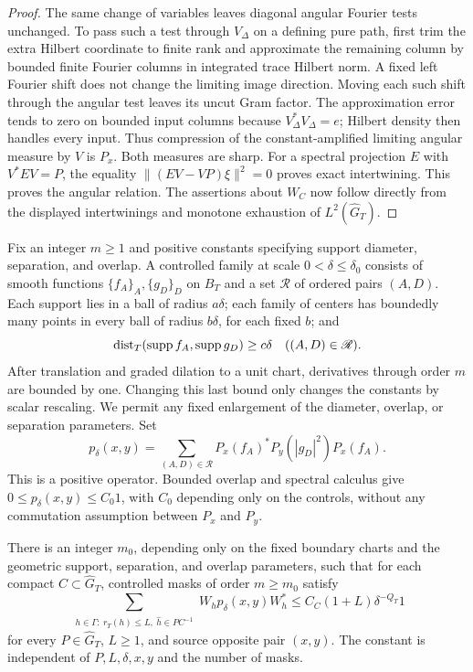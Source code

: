 \begin{proof}
The same change of variables leaves diagonal angular Fourier tests
unchanged.  To pass such a test through $V_\Delta$ on a defining pure
path, first trim the extra Hilbert coordinate to finite rank and
approximate the remaining column by bounded finite Fourier columns
in integrated trace Hilbert norm.  A fixed left Fourier shift does
not change the limiting image direction.  Moving each such shift
through the angular test leaves its uncut Gram factor.  The
approximation error tends to zero on bounded input columns because
$V_\Delta^*V_\Delta=e$; Hilbert density then handles every input.
Thus compression of the constant-amplified limiting angular measure
by $V$ is $P_x$.  Both measures are sharp.  For a spectral projection
$E$ with $V^*EV=P$, the equality
$\|(EV-VP)\xi\|^2=0$ proves exact intertwining.  This proves the
angular relation.  The assertions about $W_C$ now follow directly
from the displayed intertwinings and monotone exhaustion of
$L^2(\widehat G_T)$.
\end{proof}

\begin{definition}
\label{def:scale-mask-controls}
Fix an integer $m\ge1$ and positive constants specifying support
diameter, separation, and overlap.  A controlled family at scale
$0<\delta\le\delta_0$ consists of smooth functions
$\{f_A\}_A,\{g_D\}_D$ on $B_T$ and a set $\mathscr R$ of ordered pairs
$(A,D)$.  Each support lies in a ball of radius $a\delta$; each family
of centers has boundedly many points in every ball of radius
$b\delta$, for each fixed $b$; and
\[
 \operatorname{dist}_T(\operatorname{supp} f_A,\operatorname{supp} g_D)\ge c\delta
 \quad ((A,D)\in\mathscr R).
\]
After translation and graded dilation to a unit chart, derivatives
through order $m$ are bounded by one.  Changing this last bound only
changes the constants by scalar rescaling.  We permit any fixed
enlargement of the diameter, overlap, or separation parameters.
Set
\[
 p_\delta(x,y)
 =\sum_{(A,D)\in\mathscr R}
   P_x(f_A)^*P_y(|g_D|^2)P_x(f_A).
\]
This is a positive operator.  Bounded overlap and spectral calculus
give $0\le p_\delta(x,y)\le C_0 1$, with $C_0$ depending only on the
controls, without any commutation assumption between $P_x$ and $P_y$.
\end{definition}

\begin{lemma}
\label{lem:scale-pair-packing}
There is an integer $m_0$, depending only on the fixed boundary
charts and the geometric support, separation, and overlap parameters, such that for each compact
$C\subset\widehat G_T$, controlled masks of order $m\ge m_0$ satisfy
\begin{equation}
 \sum_{\substack{h\in\Gamma:\ r_T(h)\le L,\ \hat h\in PC^{-1}}}
 W_h p_\delta(x,y)W_h^*
 \le C_C(1+L)\delta^{-Q_T}1
 \label{eq:input-9}
\end{equation}
for every $P\in\widehat G_T$, $L\ge1$, and source opposite pair
$(x,y)$.  The constant is independent of $P,L,\delta,x,y$ and the
number of masks.
\end{lemma}

